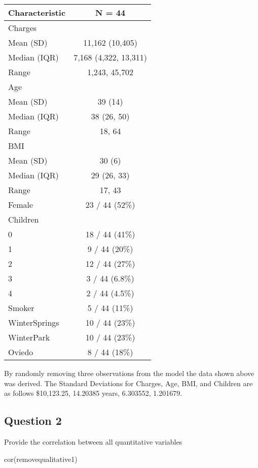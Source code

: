 \documentclass[
]{article}
\newenvironment{Shaded}{\begin{snugshade}}{\end{snugshade}}
\newcommand{\FunctionTok}[1]{\textcolor[rgb]{0.00,0.00,0.00}{#1}}
\newcommand{\NormalTok}[1]{#1}
\begin{document}
\begin{longtable}[]{@{}lc@{}}
\toprule()
\textbf{Characteristic} & \textbf{N = 44} \\
\midrule()
\endhead
Charges & \\
Mean (SD) & 11,162 (10,405) \\
Median (IQR) & 7,168 (4,322, 13,311) \\
Range & 1,243, 45,702 \\
Age & \\
Mean (SD) & 39 (14) \\
Median (IQR) & 38 (26, 50) \\
Range & 18, 64 \\
BMI & \\
Mean (SD) & 30 (6) \\
Median (IQR) & 29 (26, 33) \\
Range & 17, 43 \\
Female & 23 / 44 (52\%) \\
Children & \\
0 & 18 / 44 (41\%) \\
1 & 9 / 44 (20\%) \\
2 & 12 / 44 (27\%) \\
3 & 3 / 44 (6.8\%) \\
4 & 2 / 44 (4.5\%) \\
Smoker & 5 / 44 (11\%) \\
WinterSprings & 10 / 44 (23\%) \\
WinterPark & 10 / 44 (23\%) \\
Oviedo & 8 / 44 (18\%) \\
\bottomrule()
\end{longtable}

By randomly removing three observations from the model the data shown
above was derived. The Standard Deviations for Charges, Age, BMI, and
Children are as follows \$10,123.25, 14.20385 years, 6.303552, 1.201679.

\hypertarget{question-2}{%
\subsection{Question 2}\label{question-2}}

Provide the correlation between all quantitative variables

\begin{Shaded}
\begin{Highlighting}[]
\FunctionTok{cor}\NormalTok{(removequalitative1)}
\end{Highlighting}
\end{Shaded}
\end{document}
